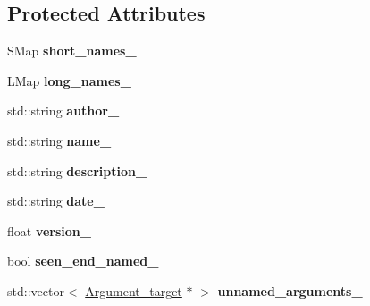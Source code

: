 \subsection*{Protected Attributes}
\begin{DoxyCompactItemize}
\item 
\hypertarget{classdsr_1_1_argument__helper_af48ce1d18dca4745ecfb0791b5eaa073}{
SMap {\bfseries short\_\-names\_\-}}
\label{classdsr_1_1_argument__helper_af48ce1d18dca4745ecfb0791b5eaa073}

\item 
\hypertarget{classdsr_1_1_argument__helper_a581bd9ccff60a518a2b4d30c1b2200c0}{
LMap {\bfseries long\_\-names\_\-}}
\label{classdsr_1_1_argument__helper_a581bd9ccff60a518a2b4d30c1b2200c0}

\item 
\hypertarget{classdsr_1_1_argument__helper_ad8e3d7d7a7450fa54871c12a7970e995}{
std::string {\bfseries author\_\-}}
\label{classdsr_1_1_argument__helper_ad8e3d7d7a7450fa54871c12a7970e995}

\item 
\hypertarget{classdsr_1_1_argument__helper_ae3e4a759e2618b16a42e02709625d132}{
std::string {\bfseries name\_\-}}
\label{classdsr_1_1_argument__helper_ae3e4a759e2618b16a42e02709625d132}

\item 
\hypertarget{classdsr_1_1_argument__helper_aca00350560476585522fe855ed4106e1}{
std::string {\bfseries description\_\-}}
\label{classdsr_1_1_argument__helper_aca00350560476585522fe855ed4106e1}

\item 
\hypertarget{classdsr_1_1_argument__helper_adc348bbd1dbcac74ffd75551010a4450}{
std::string {\bfseries date\_\-}}
\label{classdsr_1_1_argument__helper_adc348bbd1dbcac74ffd75551010a4450}

\item 
\hypertarget{classdsr_1_1_argument__helper_a493c50b524e199d754fb0025658266c1}{
float {\bfseries version\_\-}}
\label{classdsr_1_1_argument__helper_a493c50b524e199d754fb0025658266c1}

\item 
\hypertarget{classdsr_1_1_argument__helper_ad65fb9c486be7591b82e652cce082ace}{
bool {\bfseries seen\_\-end\_\-named\_\-}}
\label{classdsr_1_1_argument__helper_ad65fb9c486be7591b82e652cce082ace}

\item 
\hypertarget{classdsr_1_1_argument__helper_a3fff786951ca9a477c1b4c09b5330c2a}{
std::vector$<$ \hyperlink{classdsr_1_1_argument__helper_1_1_argument__target}{Argument\_\-target} $\ast$ $>$ {\bfseries unnamed\_\-arguments\_\-}}
\label{classdsr_1_1_argument__helper_a3fff786951ca9a477c1b4c09b5330c2a}


\end{DoxyCompactItemize}
